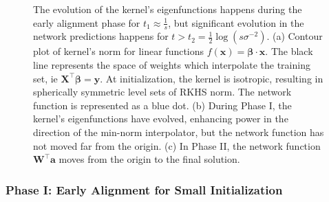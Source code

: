 \documentclass{article} %
\def\x{\bm x}
\begin{document}
\begin{figure}
    \centering
    \caption{The evolution of the kernel's eigenfunctions happens during the early alignment phase for $t_1 \approx \frac{1}{s}$, but significant evolution in the network predictions happens for $t > t_2 = \frac{1}{2}\log( s \sigma^{-2})$. (a) Contour plot of kernel's norm for linear functions $f(\x) = \bm\beta \cdot \x$. The black line represents the space of weights which interpolate the training set, ie $\bm X^\top \bm\beta = \bm y$. At initialization, the kernel is isotropic, resulting in spherically symmetric level sets of RKHS norm. The network function is represented as a blue dot. (b) During Phase I, the kernel's eigenfunctions have evolved, enhancing power in the direction of the min-norm interpolator, but the network function has not moved far from the origin. (c) In Phase II, the network function $\bm W^\top \bm a$ moves from the origin to the final solution.} 
    \label{fig:phase_one_two_visual}
\end{figure}



\subsubsection{Phase I: Early Alignment for Small Initialization}
\end{document}
